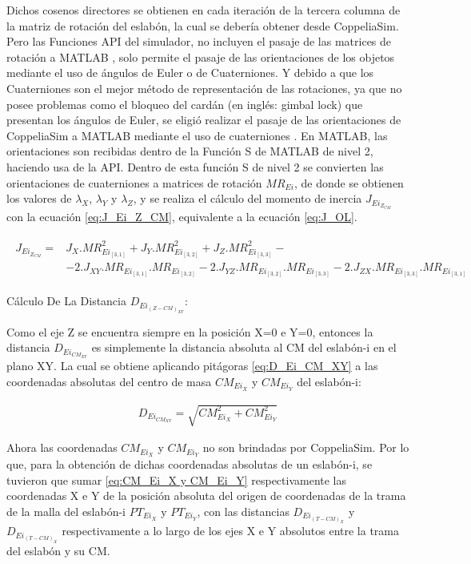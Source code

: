 \documentclass{article}
\begin{document}
\begin{sloppypar}
Dichos cosenos directores se obtienen en cada iteración de la tercera columna de la matriz de rotación del eslabón, la cual se debería obtener desde CoppeliaSim. Pero las Funciones API del simulador, no incluyen el pasaje de las matrices de rotación a MATLAB \cite{API_Functions_MATLAB} \cite{MR_to_MATLAB}, solo permite el pasaje de las orientaciones de los objetos mediante el uso de ángulos de Euler o de Cuaterniones. Y debido a que los Cuaterniones son el mejor método de representación de las rotaciones, ya que no posee problemas como el bloqueo del cardán (en inglés: gimbal lock) que presentan los ángulos de Euler, se eligió realizar el pasaje de las orientaciones de CoppeliaSim a MATLAB mediante el uso de cuaterniones \cite{Cuaterniones}. En MATLAB, las orientaciones son recibidas dentro de la Función S de MATLAB de nivel 2, haciendo usa de la API. Dentro de esta función S de nivel 2 se convierten las orientaciones de cuaterniones a matrices de rotación $MR_{Ei}$, de donde se obtienen los valores de $\lambda_X$, $\lambda_Y$ y $\lambda_Z$, y se realiza el cálculo del momento de inercia $J_{Ei_{Z_{CM}}}$ con la ecuación \ref{eq:J_Ei_Z_CM}, equivalente a la ecuación \ref{eq:J_OL}.

\begin{align} \label{eq:J_Ei_Z_CM}
    \begin{aligned}
    J_{Ei_{Z_{CM}}} =
    & J_X.MR_{Ei_{[3,1]}}^2+J_Y.MR_{Ei_{[3,2]}}^2+J_Z.MR_{Ei_{[3,3]}}^2- \\
    & -2.J_{XY}.MR_{Ei_{[3,1]}}.MR_{Ei_{[3,2]}}-2.J_{YZ}.MR_{Ei_{[3,2]}}.MR_{Ei_{[3,3]}}-2.J_{ZX}.MR_{Ei_{[3,3]}}.MR_{Ei_{[3,1]}}
    \end{aligned}
\end{align}

\hfill

Cálculo De La Distancia $D_{Ei_{(Z-CM)_{XY}}}$:

\hfill

Como el eje Z se encuentra siempre en la posición X=0 e Y=0, entonces la distancia $D_{Ei_{CM_{XY}}}$ es simplemente la distancia absoluta al CM del eslabón-i en el plano XY. La cual se obtiene aplicando pitágoras \ref{eq:D_Ei_CM_XY} a las coordenadas absolutas del centro de masa $CM_{Ei_X}$ y $CM_{Ei_Y}$ del eslabón-i:

\begin{align} \label{eq:D_Ei_CM_XY}
    D_{Ei_{CM_{XY}}} = \sqrt{CM_{Ei_X}^2+CM_{Ei_Y}^2}
\end{align}

Ahora las coordenadas $CM_{Ei_X}$ y $CM_{Ei_Y}$ no son brindadas por CoppeliaSim. Por lo que, para la obtención de dichas coordenadas absolutas de un eslabón-i, se tuvieron que sumar \ref{eq:CM_Ei_X y CM_Ei_Y} respectivamente las coordenadas X e Y de la posición absoluta del origen de coordenadas de la trama de la malla del eslabón-i $PT_{Ei_X}$ y $PT_{Ei_Y}$, con las distancias $D_{Ei_{(T-CM)_X}}$ y $D_{Ei_{(T-CM)_X}}$ respectivamente a lo largo de los ejes X e Y absolutos entre la trama del eslabón y su CM.


\end{sloppypar}
\end{document}

